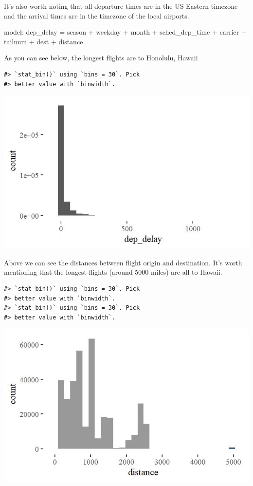 \documentclass[]{tufte-handout}
\begin{document}
It's also worth noting that all departure times are in the US Eastern
timezone and the arrival times are in the timezone of the local
airports.

model: dep\_delay = season + weekday + month + sched\_dep\_time +
carrier + tailnum + dest + distance

As you can see below, the longest flights are to Honolulu, Hawaii

\begin{verbatim}
#> `stat_bin()` using `bins = 30`. Pick
#> better value with `binwidth`.
\end{verbatim}

\includegraphics[width=0.75\linewidth,height=0.75\textheight]{flights_analysis_files/figure-latex/unnamed-chunk-1-1}

Above we can see the distances between flight origin and destination.
It's worth mentioning that the longest flights (around 5000 miles) are
all to Hawaii.

\begin{verbatim}
#> `stat_bin()` using `bins = 30`. Pick
#> better value with `binwidth`.
#> `stat_bin()` using `bins = 30`. Pick
#> better value with `binwidth`.
\end{verbatim}

\includegraphics[width=0.75\linewidth,height=0.75\textheight]{flights_analysis_files/figure-latex/unnamed-chunk-2-1}
\end{document}
